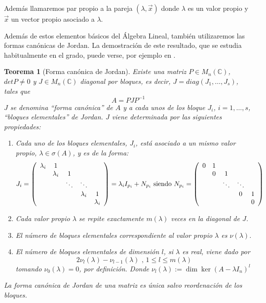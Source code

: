 \documentclass[size=a4, parskip=half, titlepage=false, toc=flat, toc=bib, 12pt]{scrartcl}
\theoremstyle{theorem-style}
\newtheorem{nth}{Teorema}[section]
\theoremstyle{definition-style}
\theoremstyle{remark-style}
\theoremstyle{example-style}
\theoremstyle{definition-style}
\theoremstyle{remark-style}
\begin{document}
Además llamaremos par propio a la pareja $(\lambda, \vec{x})$ donde $\lambda$ es un valor propio y $\vec{x}$ un vector propio asociado a $\lambda$.

Además de estos elementos básicos del Álgebra Lineal, también utilizaremos las formas canónicas de Jordan. La demostración de este resultado, que se estudia habitualmente en el grado, puede verse, por ejemplo en \cite{jordan}.

\begin{nth}[Forma canónica de Jordan]
Existe una matriz $P \in M_n(\mathbb{C})$, $det P \neq 0$ y $J \in M_n(\mathbb{C})$ diagonal por bloques, es decir, $J = diag(J_1, \dots, J_s)$, tales que
$$A = P J P^{-1} $$
$J$ se denomina ``forma canónica'' de $A$ y a cada unos de los bloque $J_i$, $i = 1, \dots, s$,  ``bloques elementales'' de Jordan. $J$ viene determinada por las siguientes propiedades:
\begin{enumerate}
\item Cada uno de los bloques elementales, $J_i$, está asociado a un mismo valor propio, $\lambda \in \sigma(A)$, y es de la forma:
$$J_i = \left(
      \begin{array}{{ccccc}}
        \lambda_i   &   1       &         &    & \\
              &    \lambda_i    &    1     &    & \\
              &           & \ddots  &  \ddots   & \\
              &           &         & \lambda_i & 1 \\
              &           &         &           & \lambda_i
      \end{array}
\right) = \lambda_i I_{p_i} + N_{p_i} \textrm{ siendo } N_{p_i} = \left(
      \begin{array}{{ccccc}}
            0   &   1       &         &    & \\
              &    0    &    1     &    & \\
              &           & \ddots  &  \ddots   & \\
              &           &         & 0 & 1 \\
              &           &         &           & 0
      \end{array}
\right)$$
\item Cada valor propio $\lambda$ se repite exactamente $m(\lambda)$ veces en la diagonal de $J$.
\item El número de bloques elementales correspondiente al valor propio $\lambda$ es $\nu(\lambda)$.
\item El número de bloques elementales de dimensión $l$, si $\lambda$ es real, viene dado por
$$2 \nu_l(\lambda) - \nu_{l-1}(\lambda) \textrm{ , } 1 \leq l \leq m(\lambda)$$
tomando $\nu_0(\lambda) = 0$, por definición. Donde $\nu_l(\lambda) := \dim  \ker(A - \lambda I_n)^l $
\end{enumerate}
La forma canónica de Jordan de una matriz es única salvo reordenación de los bloques.
\end{nth}
\end{document}
